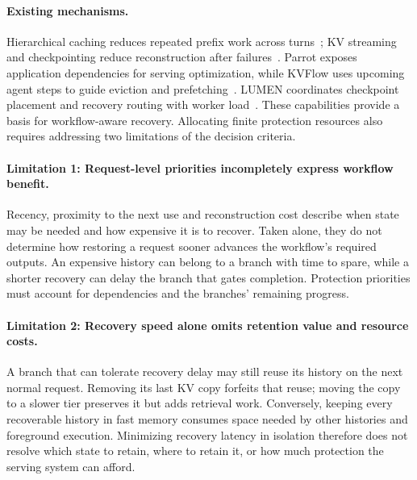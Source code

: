 \paragraph{Existing mechanisms.}
Hierarchical caching reduces repeated prefix work across
turns~\cite{gao2024cachedattention,qin2025mooncake}; KV streaming and
checkpointing reduce reconstruction after
failures~\cite{strati2024dejavu,jayakody2026ghostserve}.
Parrot exposes application dependencies for serving optimization, while
KVFlow uses upcoming agent steps to guide eviction and
prefetching~\cite{lin2024parrot,pan2025kvflow}. LUMEN coordinates
checkpoint placement and recovery routing with worker
load~\cite{cao2026lumen}. These capabilities provide a basis for
workflow-aware recovery. Allocating finite protection resources also
requires addressing two limitations of the decision criteria.

\paragraph{Limitation 1: Request-level priorities incompletely express
workflow benefit.}
Recency, proximity to the next use and reconstruction cost describe when
state may be needed and how expensive it is to recover. Taken alone,
they do not determine how restoring a request sooner advances the
workflow's required outputs. An expensive history can belong to a branch
with time to spare, while a shorter recovery can delay the branch that
gates completion. Protection priorities must account for dependencies
and the branches' remaining progress.

\paragraph{Limitation 2: Recovery speed alone omits retention value and
resource costs.}
A branch that can tolerate recovery delay may still reuse its history
on the next normal request. Removing its last KV copy forfeits that reuse;
moving the copy to a slower tier preserves it but adds retrieval work.
Conversely, keeping every recoverable history in fast memory consumes
space needed by other histories and foreground execution. Minimizing
recovery latency in isolation therefore does not resolve which state
to retain, where to retain it, or how much protection the serving system
can afford.

